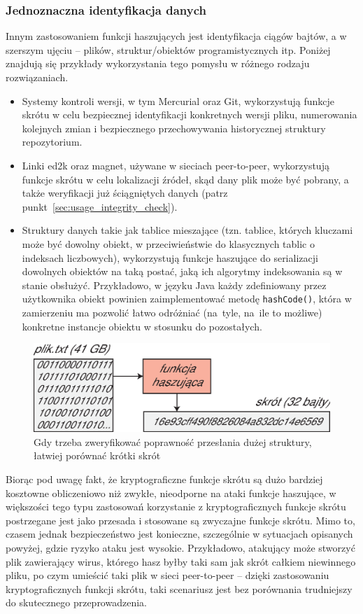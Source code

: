 \documentclass[12pt,a4paper,twoside]{article}
\begin{document}
\subsubsection{Jednoznaczna identyfikacja danych}

Innym zastosowaniem funkcji haszujących jest identyfikacja ciągów bajtów, a w
szerszym ujęciu -- plików, struktur/obiektów programistycznych itp. Poniżej
znajdują się przykłady wykorzystania tego pomysłu w różnego rodzaju
rozwiązaniach.
\begin{itemize}
\item Systemy kontroli wersji, w tym Mercurial oraz Git, wykorzystują funkcje
skrótu w celu bezpiecznej identyfikacji konkretnych wersji pliku, numerowania
kolejnych zmian i bezpiecznego przechowywania historycznej struktury
repozytorium.

\item Linki ed2k oraz magnet, używane w sieciach peer-to-peer, wykorzystują
funkcje skrótu w celu lokalizacji źródeł, skąd dany plik może być pobrany, a
także weryfikacji już ściągniętych danych (patrz
punkt~\ref{sec:usage_integrity_check}).
\item Struktury danych takie jak tablice mieszające (tzn. tablice, których
kluczami może być dowolny obiekt, w przeciwieństwie do klasycznych tablic o
indeksach liczbowych), wykorzystują funkcje haszujące do serializacji dowolnych
obiektów na taką postać, jaką ich algorytmy indeksowania są w stanie obsłużyć.
Przykładowo, w języku Java każdy zdefiniowany przez użytkownika obiekt powinien
zaimplementować metodę \texttt{hashCode()}, która w zamierzeniu ma pozwolić
łatwo odróżniać (na~tyle, na~ile to możliwe) konkretne instancje obiektu w
stosunku do pozostałych.
\end{itemize}

\begin{figure}[bht]
\includegraphics[width=12cm]{img/usage3.eps}
\caption{Gdy trzeba zweryfikować poprawność przesłania dużej struktury, łatwiej
porównać krótki skrót}
\end{figure}

Biorąc pod uwagę fakt, że kryptograficzne funkcje skrótu są dużo bardziej
kosztowne obliczeniowo niż zwykłe, nieodporne na ataki funkcje haszujące, w
większości tego typu zastosowań korzystanie z kryptograficznych funkcje skrótu
postrzegane jest jako przesada i stosowane są zwyczajne funkcje skrótu. Mimo
to, czasem jednak bezpieczeństwo jest konieczne, szczególnie w sytuacjach
opisanych powyżej, gdzie ryzyko ataku jest wysokie. Przykładowo, atakujący może
stworzyć plik zawierający wirus, którego hasz byłby taki sam jak skrót całkiem
niewinnego pliku, po czym umieścić taki plik w sieci peer-to-peer -- dzięki
zastosowaniu kryptograficznych funkcji skrótu, taki scenariusz jest bez
porównania trudniejszy do skutecznego przeprowadzenia.
\end{document}
